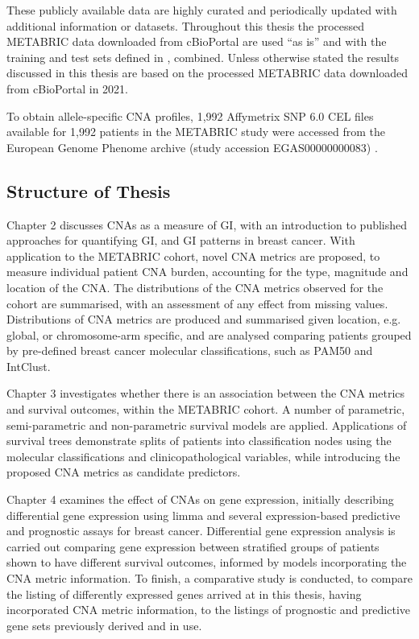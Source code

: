These publicly available data are highly curated and periodically updated with additional information or datasets. Throughout this thesis the processed METABRIC data downloaded from cBioPortal are used “as is” and with the training and test sets defined in \cite{pmid22522925}, combined. Unless otherwise stated the results discussed in this thesis are based on the processed METABRIC data downloaded from cBioPortal in 2021.   

To obtain allele-specific CNA profiles, 1,992 Affymetrix SNP 6.0 CEL files available for 1,992 patients in the METABRIC study were accessed from the European Genome Phenome archive (study accession EGAS00000000083) \citep{pmid22522925, pmid34791407}. 

\subsection{Structure of Thesis}
Chapter 2 discusses CNAs as a measure of GI, with an introduction to published approaches for quantifying GI, and GI patterns in breast cancer. With application to the METABRIC cohort, novel CNA metrics are proposed, to measure individual patient CNA burden, accounting for the type, magnitude and location of the CNA. The distributions of the CNA metrics observed for the cohort are summarised, with an assessment of any effect from missing values. Distributions of CNA metrics are produced and summarised given location, e.g. global, or chromosome-arm specific, and are analysed comparing patients grouped by pre-defined breast cancer molecular classifications, such as PAM50 and IntClust.  

Chapter 3 investigates whether there is an association between the CNA metrics and survival outcomes, within the METABRIC cohort. A number of parametric, semi-parametric and non-parametric survival models are applied. Applications of survival trees demonstrate splits of patients into classification nodes using the molecular classifications and clinicopathological variables, while introducing the proposed CNA metrics as candidate predictors. 

Chapter 4 examines the effect of CNAs on gene expression, initially describing differential gene expression using limma and several expression-based predictive and prognostic assays for breast cancer. Differential gene expression analysis is carried out comparing gene expression between stratified groups of patients shown to have different survival outcomes, informed by models incorporating the CNA metric information. To finish, a comparative study is conducted, to compare the listing of differently expressed genes arrived at in this thesis, having incorporated CNA metric information, to the listings of prognostic and predictive gene sets previously derived and in use.


